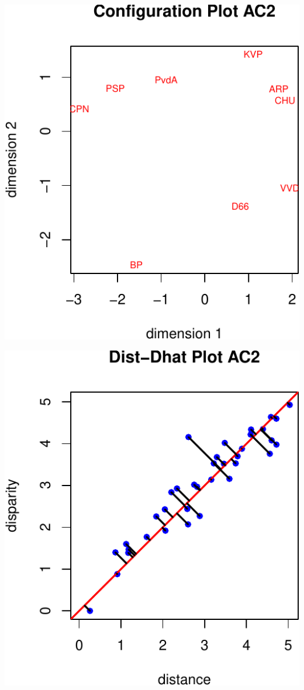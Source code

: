 \documentclass[
  12pt,
]{article}
\begin{document}
\begin{center}\includegraphics{smacofAC_files/figure-latex/gruijterh10-2} \end{center}

\begin{center}\includegraphics{smacofAC_files/figure-latex/gruijterh10-3} \end{center}
\end{document}
